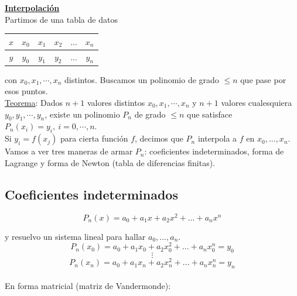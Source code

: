 \underline{\textbf{Interpolaci\'on}}\\

Partimos de una tabla de datos

\begin{table}[h]
    \centering
    \begin{tabular}{|c|c|c|c|c|c|}
        \hline
        $x$ & $x_{0}$ & $x_{1}$ & $x_{2}$ & $...$ & $x_{n}$\\ \hline
        $y$ & $y_{0}$ & $y_{1}$ & $y_{2}$ & $...$ & $y_{n}$\\ \hline
    \end{tabular}
\end{table}

con $x_{0}, x_{1}, \cdots , x_{n}$ distintos. Buscamos un polinomio de grado $\leq n$ que pase por esos puntos.\\

\underline{Teorema}: Dados $n + 1$ valores distintos $x_{0}, x_{1}, \cdots , x_{n}$ y $n + 1$ valores cualesquiera $y_{0}, y_{1}, \cdots , y_{n}$, existe un polinomio $P_{n}$ de grado $\leq n$ que satisface $P_{n}(x_{i}) = y_{i}, \ i = 0, \cdots , n$.\\

Si $y_{i} = f(x_{j})$ para cierta funci\'on $f$, decimos que $P_{n}$ interpola a $f$ en $x_{0}, ... , x_{n}$.\\

Vamos a ver tres maneras de armar $P_{n}$: coeficientes indeterminados, forma de Lagrange y forma de Newton (tabla de diferencias finitas).\\

\subsection{Coeficientes indeterminados}

$$P_{n}(x) = a_{0} + a_{1}x + a_{2}x^{2} + ... + a_{n}x^{n}$$

y resuelvo un sistema lineal para hallar $a_{0}, ... ,a_{n}$.\\

$$P_{n}(x_{0}) = a_{0} + a_{1}x_{0} + a_{2}x_{0}^{2} + ... + a_{n}x_{0}^{n} = y_{0}$$
$$ \vdots $$
$$P_{n}(x_{n}) = a_{0} + a_{1}x_{n} + a_{2}x_{n}^{2} + ... + a_{n}x_{n}^{n} = y_{n}$$\\

En forma matricial (matriz de Vandermonde):

